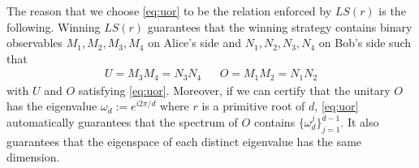 \documentclass[11pt,letterpaper]{article}
\newcommand{\ket}[1]{|#1\rangle}
\newcommand{\x}{\otimes}
\newcommand{\1}{\mathbb{1}}
\newcommand{\LS}{LS}
\theoremstyle{definition}
\begin{document}
The reason that we choose \cref{eq:uor} to be the relation enforced
by $\LS(r)$ is the following.
Winning $\LS(r)$ guarantees that the winning strategy contains binary observables
$M_1, M_2, M_3, M_4$ on Alice's side and 
$N_1, N_2, N_3, N_4$ on Bob's side such that 
\begin{align*}
    U = M_3M_4 = N_3N_4 && O = M_1M_2 = N_1N_2
\end{align*}
with $U$ and $O$ satisfying \cref{eq:uor}.
Moreover, if we can certify that the unitary $O$
has the eigenvalue $\omega_d := e^{i 2\pi /d }$
where $r$ is a primitive root of $d$, \cref{eq:uor}
automatically guarantees that the spectrum of $O$ contains 
$\{ \omega_d^j \}_{j=1}^{d-1}$.
It also guarantees that the eigenspace of each distinct eigenvalue
has the same dimension. 

\end{document}
